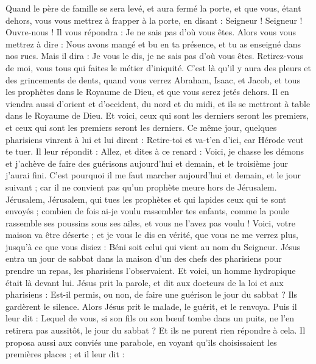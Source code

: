 \begin{multicols}{2}
Quand le père de famille se sera levé, et aura fermé la porte, et que vous, étant dehors, vous vous mettrez à frapper à la porte, en disant : Seigneur ! Seigneur ! Ouvre-nous ! Il vous répondra : Je ne sais pas d'où vous êtes.
Alors vous vous mettrez à dire : Nous avons mangé et bu en ta présence, et tu as enseigné dans nos rues.
Mais il dira : Je vous le dis, je ne sais pas d'où vous êtes. Retirez-vous de moi, vous tous qui faites le métier d'iniquité.
C’est là qu’il y aura des pleurs et des grincements de dents, quand vous verrez Abraham, Isaac, et Jacob, et tous les prophètes dans le Royaume de Dieu, et que vous serez jetés dehors.
Il en viendra aussi d'orient et d'occident, du nord et du midi, et ils se mettront à table dans le Royaume de Dieu.
Et voici, ceux qui sont les derniers seront les premiers, et ceux qui sont les premiers seront les derniers.
Ce même jour, quelques pharisiens vinrent à lui et lui dirent : Retire-toi et va-t’en d'ici, car Hérode veut te tuer.
Il leur répondit : Allez, et dites à ce renard : Voici, je chasse les démons et j'achève de faire des guérisons aujourd'hui et demain, et le troisième jour j’aurai fini.
C'est pourquoi il me faut marcher aujourd'hui et demain, et le jour suivant ; car il ne convient pas qu'un prophète meure hors de Jérusalem.
Jérusalem, Jérusalem, qui tues les prophètes et qui lapides ceux qui te sont envoyés ; combien de fois ai-je voulu rassembler tes enfants, comme la poule rassemble ses poussins sous ses ailes, et vous ne l'avez pas voulu !
Voici, votre maison va être déserte ; et je vous le dis en vérité, que vous ne me verrez plus, jusqu'à ce que vous disiez : Béni soit celui qui vient au nom du Seigneur.
\VerseOne{}Jésus entra un jour de sabbat dans la maison d'un des chefs des pharisiens pour prendre un repas, les pharisiens l'observaient.
Et voici, un homme hydropique était là devant lui.
Jésus prit la parole, et dit aux docteurs de la loi et aux pharisiens : Est-il permis, ou non, de faire une guérison le jour du sabbat ?
Ils gardèrent le silence. Alors Jésus prit le malade, le guérit, et le renvoya.
Puis il leur dit : Lequel de vous, si son fils ou son bœuf tombe dans un puits, ne l’en retirera pas aussitôt, le jour du sabbat ?
Et ils ne purent rien répondre à cela.
Il proposa aussi aux conviés une parabole, en voyant qu’ils choisissaient les premières places ; et il leur dit :

\end{multicols}

